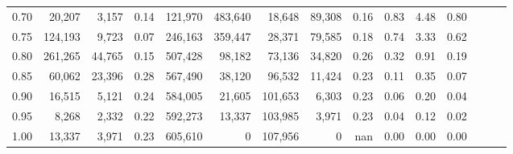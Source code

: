 \begin{tabular}{rrrrrrrrrrrrrrr}
0.70 &   20,207 &   3,157 &  0.14 &  121,970 &  483,640 &   18,648 &   89,308 &  0.16 &  0.83 &  4.48 &      0.80 \\
0.75 &  124,193 &   9,723 &  0.07 &  246,163 &  359,447 &   28,371 &   79,585 &  0.18 &  0.74 &  3.33 &      0.62 \\
0.80 &  261,265 &  44,765 &  0.15 &  507,428 &   98,182 &   73,136 &   34,820 &  0.26 &  0.32 &  0.91 &      0.19 \\
0.85 &   60,062 &  23,396 &  0.28 &  567,490 &   38,120 &   96,532 &   11,424 &  0.23 &  0.11 &  0.35 &      0.07 \\
0.90 &   16,515 &   5,121 &  0.24 &  584,005 &   21,605 &  101,653 &    6,303 &  0.23 &  0.06 &  0.20 &      0.04 \\
0.95 &    8,268 &   2,332 &  0.22 &  592,273 &   13,337 &  103,985 &    3,971 &  0.23 &  0.04 &  0.12 &      0.02 \\
1.00 &   13,337 &   3,971 &  0.23 &  605,610 &        0 &  107,956 &        0 &   nan &  0.00 &  0.00 &      0.00 \\
\bottomrule
\end{tabular}
